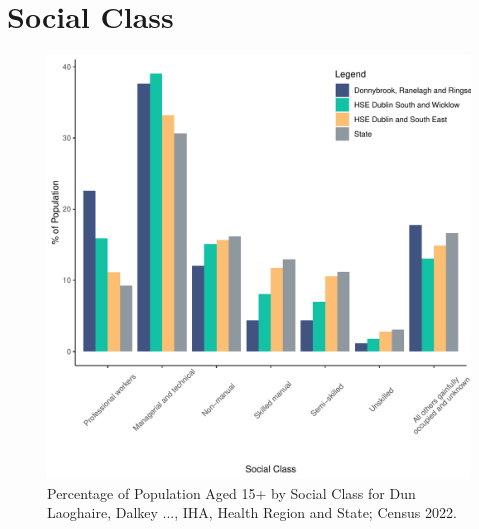 \documentclass{article}
\begin{document}
\section{Social Class}\label{sect:SC}
\begin{figure}[H]
	\centering
	\includegraphics[width = 140mm]{../figures/SocialClassED.pdf}
	\caption{Percentage of Population Aged 15+ by Social Class for Dun Laoghaire, Dalkey ..., IHA, Health Region and State; Census 2022.}
	\label{fig:vbnv}
	\end{figure}
\end{document}
